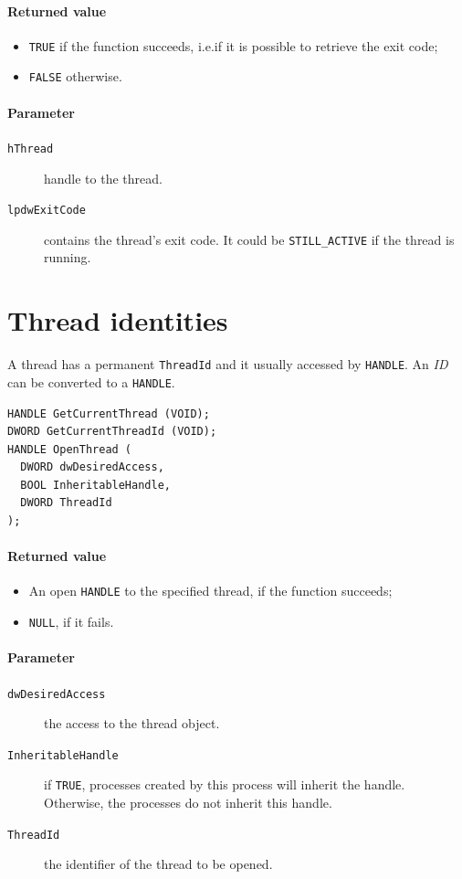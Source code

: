 \paragraph{Returned value}
\begin{itemize}
\item \texttt{TRUE} if the function succeeds, i.e.\@ if it is possible to retrieve the exit code;
\item \texttt{FALSE} otherwise.
\end{itemize}

\paragraph{Parameter}
\begin{description}
\item [\texttt{hThread}] handle to the thread.
\item [\texttt{lpdwExitCode}] contains the thread's exit code. It could be \texttt{STILL\_ACTIVE} if the thread is running.
\end{description}

\section{Thread identities}
A thread has a permanent \texttt{ThreadId} and it usually accessed by \texttt{HANDLE}. An \emph{ID} can be converted to a \texttt{HANDLE}.

\begin{verbatim}
HANDLE GetCurrentThread (VOID);
DWORD GetCurrentThreadId (VOID);
HANDLE OpenThread (
  DWORD dwDesiredAccess,
  BOOL InheritableHandle,
  DWORD ThreadId
);
\end{verbatim}

\paragraph{Returned value}
\begin{itemize}
\item An open \texttt{HANDLE} to the specified thread, if the function succeeds;
\item \texttt{NULL}, if it fails.
\end{itemize}

\paragraph{Parameter}
\begin{description}
\item [\texttt{dwDesiredAccess}] the access to the thread object.
\item [\texttt{InheritableHandle}] if \texttt{TRUE}, processes created by this process will inherit the handle. Otherwise, the processes do not inherit this handle.
\item [\texttt{ThreadId}] the identifier of the thread to be opened.
\end{description}

